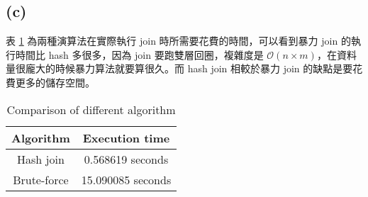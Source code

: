 \documentclass{article}
\begin{document}
\subsection*{(c)}
表 \ref{tab:6_c} 為兩種演算法在實際執行 join 時所需要花費的時間，可以看到暴力 join 的執行時間比 hash 多很多，因為 join 要跑雙層回圈，複雜度是 $\mathcal{O}(n \times m)$，在資料量很龐大的時候暴力算法就要算很久。而 hash join 相較於暴力 join 的缺點是要花費更多的儲存空間。
\begin{table}[H]
    \centering
    \begin{tabular}{cc}
    \toprule
    \textbf{Algorithm} & \textbf{Execution time} \\
    \midrule
    Hash join & 0.568619 seconds \\
    Brute-force & 15.090085 seconds \\
    \bottomrule
    \end{tabular}
    \caption{Comparison of different algorithm}
    \label{tab:6_c}
\end{table}
\end{document}
